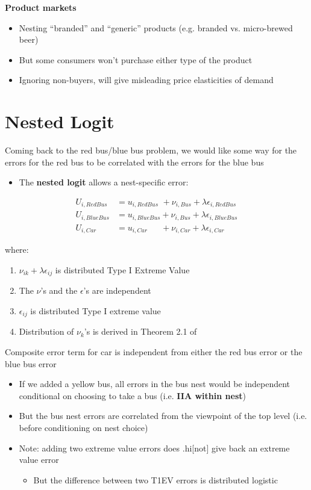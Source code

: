 \documentclass[11pt]{article}
\begin{document}
\textbf{Product markets}
\begin{itemize}
\item Nesting ``branded'' and ``generic'' products (e.g. branded vs. micro-brewed beer)
\item But some consumers won't purchase either type of the product
\item Ignoring non-buyers, will give misleading price elasticities of demand
\end{itemize}

\section{Nested Logit}
\label{sec:orgff15ae3}

Coming back to the red bus/blue bus problem, we would like some way for the errors for the red bus to be correlated with the errors for the blue bus
\begin{itemize}
\item The \textbf{nested logit} allows a nest-specific error:
\end{itemize}

\begin{align*}
U_{i,RedBus}&=u_{i,RedBus\phantom{e}}+\nu_{i,Bus}+\lambda\epsilon_{i,RedBus}\\
U_{i,BlueBus}&=u_{i,BlueBus}+\nu_{i,Bus}+\lambda\epsilon_{i,BlueBus}\\
U_{i,Car}&=u_{i,Car\phantom{eBus}}+\nu_{i,Car}+\lambda\epsilon_{i,Car}
\end{align*}

where:

\begin{enumerate}
\item \(\nu_{ik}+\lambda\epsilon_{ij}\) is distributed Type I Extreme Value
\item The \(\nu\)'s and the \(\epsilon\)'s are independent
\item \(\epsilon_{ij}\) is distributed Type I extreme value
\item Distribution of \(\nu_k\)'s is derived in Theorem 2.1 of \textcite{cardell1997}
\end{enumerate}

Composite error term for car is independent from either the red bus error or the blue bus error  

\begin{itemize}
\item If we added a yellow bus, all errors in the bus nest would be independent conditional on choosing to take a bus (i.e. \textbf{IIA within nest})
\item But the bus nest errors are correlated from the viewpoint of the top level (i.e. before conditioning on nest choice)
\item Note: adding two extreme value errors does .hi[not] give back an extreme value error
\begin{itemize}
\item But the difference between two T1EV errors is distributed logistic
\end{itemize}
\end{itemize}
\end{document}
